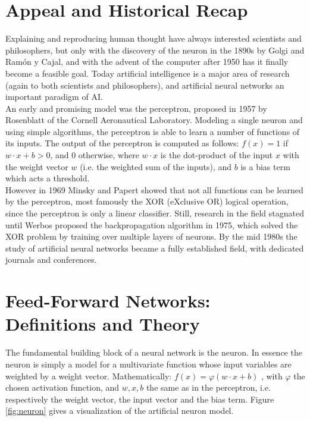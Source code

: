 \documentclass[12pt,oneside]{CUNY_CS_PhD}
\begin{document}
\section{Appeal and Historical Recap}
Explaining and reproducing human thought have always interested scientists and philosophers, but only with the discovery of the neuron in the 1890s by Golgi and Ram\'{o}n y Cajal, and with the advent of the computer after 1950 has it finally become a feasible goal. Today artificial intelligence is a major area of research (again to both scientists and philosophers), and artificial neural networks an important paradigm of AI.\\
An early and promising model was the perceptron, proposed in 1957 by Rosenblatt \cite{rosenblatt_perceptron_1957} of the Cornell Aeronautical Laboratory. Modeling a single neuron and using simple algorithms, the perceptron is able to learn a number of functions of its inputs. The output of the perceptron is computed as follows: $f(x) = 1$ if $w \cdot x + b>0$, and $0$ otherwise, where $w \cdot x$ is the dot-product of the input $x$ with the weight vector $w$ (i.e. the weighted sum of the inputs), and $b$ is a bias term which acts a threshold.\\
However in 1969 Minsky and Papert \cite{minsky_perceptrons_1969} showed that not all functions can be learned by the perceptron, most famously the XOR (eXclusive OR) logical operation, since the perceptron is only a linear classifier. Still, research in the field stagnated until Werbos proposed the backpropagation algorithm in 1975, which solved the XOR problem by training over multiple layers of neurons. By the mid 1980s the study of artificial neural networks became a fully established field, with dedicated journals and conferences.

\section{Feed-Forward Networks: Definitions and Theory}
The fundamental building block of a neural network is the neuron. In essence the neuron is simply a model for a multivariate function whose input variables are weighted by a weight vector. Mathematically: $f(x) = \varphi(w \cdot x +b)$ , with $\varphi$ the chosen activation function, and $w,x,b$ the same as in the perceptron, i.e. respectively the weight vector, the input vector and the bias term. Figure \ref{fig:neuron} gives a visualization of the artificial neuron model.\\
\end{document}
